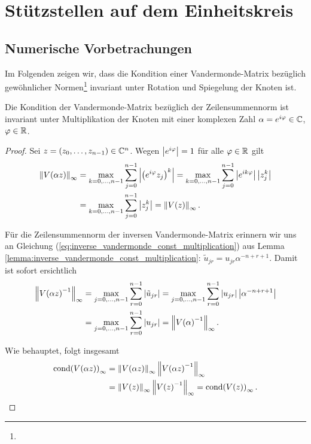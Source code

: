 \chapter{Stützstellen auf dem Einheitskreis}
\section{Numerische Vorbetrachungen}

Im Folgenden zeigen wir, dass die Kondition einer Vandermonde-Matrix bezüglich
gewöhnlicher Normen\footnote{}%
invariant unter Rotation und Spiegelung der Knoten ist.


\begin{lemma}
    \label{lemma:vandermonde_rotation_invariance}
    Die Kondition der Vandermonde-Matrix bezüglich der Zeilensummennorm ist
    invariant unter Multiplikation der Knoten mit einer komplexen Zahl
    $\alpha = e^{i\varphi} \in \mathbb{C}$, $\varphi \in \mathbb{R}$.
\end{lemma}

\begin{proof}
    Sei $z = (z_0, \dots, z_{n-1}) \in \mathbb{C}^n$.
    Wegen $\left\lvert e^{i\varphi} \right\rvert = 1$ für alle $\varphi \in \mathbb{R}$ gilt
    \[
        \begin{split}
            \left\lVert V \! \left( \alpha z \right) \right\rVert_\infty
            &= \max_{k=0, \dots, n-1} \sum_{j=0}^{n-1} \left\lvert \left(e^{i\varphi} z_j\right)^k \right\rvert
            = \max_{k=0, \dots, n-1} \sum_{j=0}^{n-1} \left\lvert e^{ik\varphi} \right\rvert \left\lvert z_j^k \right\rvert\\
            &= \max_{k=0, \dots, n-1} \sum_{j=0}^{n-1} \left\lvert z_j^k \right\rvert
            = \left\lVert V \! \left( z \right) \right\rVert_\infty.
        \end{split}
    \]

    \noindent Für die Zeilensummennorm der inversen Vandermonde-Matrix erinnern wir uns an Gleichung
    (\ref{eq:inverse_vandermonde_const_multiplication})
    aus Lemma \ref{lemma:inverse_vandermonde_const_multiplication}:
    $\tilde{u}_{jr} = u_{jr} \alpha^{-n+r+1}$.
    Damit ist sofort ersichtlich
    \[
        \begin{split}
            \left\lVert V \! \left( \alpha z \right)^{-1} \right\rVert_\infty
            &= \max_{j=0, \dots, n-1} \sum_{r=0}^{n-1} \left\lvert \tilde{u}_{jr} \right\rvert
            = \max_{j=0, \dots, n-1} \sum_{r=0}^{n-1} \left\lvert u_{jr} \right\rvert \left\lvert \alpha^{-n+r+1} \right\rvert\\
            &= \max_{j=0, \dots, n-1} \sum_{r=0}^{n-1} \left\lvert u_{jr} \right\rvert
            = \left\lVert V \! \left( \alpha \right)^{-1} \right\rVert_\infty.
        \end{split}
    \]

    \noindent Wie behauptet, folgt insgesamt
    \[
        \begin{split}
            \cond{\Vand{\alpha z}}_\infty
            &= \norm{\Vand{\alpha z}}_\infty \norm{\Vand{\alpha z}^{-1}}_\infty\\
            &= \norm{\Vand{z}}_\infty \norm{\Vand{z}^{-1}}_\infty
            = \cond{\Vand{z}}_\infty.
        \end{split}
    \]

\end{proof}

